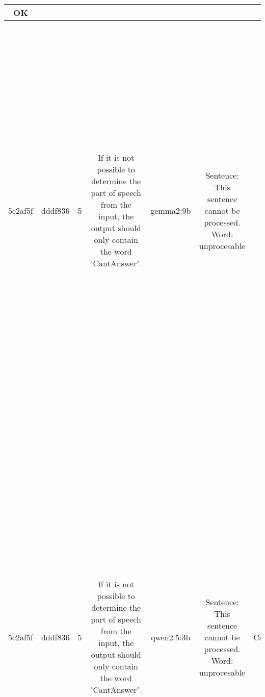 \begin{table}[h!]
\begin{tabular}{|c|c|c|c|c|c|c|c|c|c|}
OK & \\
\hline
5c2af5f & dddf836 & 5 & If it is not possible to determine the part of speech from the input, the output should only contain the word "CantAnswer". & gemma2:9b & Sentence: This sentence cannot be processed. Word: unprocesable & JJ  
 & ok & The chatbot's output, "JJ," is a part-of-speech tag listed in the provided description. It corresponds to an "Adjective." The description specifies that the chatbot should return only a part-of-speech tag or "Unknown" or "CantAnswer" if applicable. Since "JJ" is a valid part-of-speech tag from the list provided in the description, there is no violation here. 

OK & \\
\hline
5c2af5f & dddf836 & 5 & If it is not possible to determine the part of speech from the input, the output should only contain the word "CantAnswer". & qwen2.5:3b & Sentence: This sentence cannot be processed. Word: unprocesable & CantAnswer & ok & The chatbot's output is "CantAnswer." According to the description, "CantAnswer" is a valid response if the chatbot is unable to tag the word with the alphabetized list of part-of-speech tags provided. Since no additional context is needed to evaluate this specific response against the description, and since "CantAnswer" is listed as a permissible output by the description, the output complies with the guidelines set by the description.

OK & \\
\hline
5c2af5f & dddf836 & 5 & If it is not possible to determine the part of speech from the input, the output should only contain the word "CantAnswer". & llama3.2:1b & Sentence: This sentence cannot be processed. Word: unprocesable & CC: Un procesable 
WRB: Uncan not procesable & err & The chatbot's output does not comply with the description for the following reasons:

1. The task requires returning only one part of speech tag for the given word. However, the chatbot has provided two tags: "CC: Un procesable" and "WRB: Uncan not procesable". This does not align with the requirement to return a single tag.

2. The output includes additional phrases, "Un procesable" and "Uncan not procesable," which are not required by the task. The description states that only the part of speech tag should be returned.

In conclusion, the output does not conform to the instructions, which require a solitary tag without any additional text.


\end{tabular}
\end{table}
